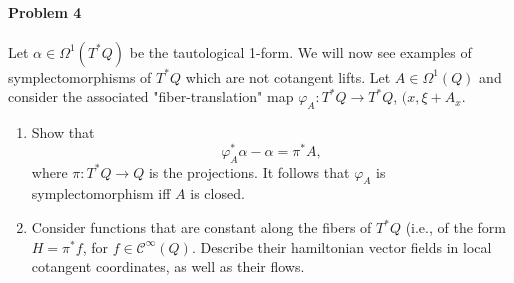 \paragraph{Problem 4} Let $\alpha\in\Omega^{1}(T^*Q)$ be the tautological 1-form. We will now see examples of symplectomorphisms of $T^*Q$ which are not cotangent lifts. Let $A\in\Omega^{1}(Q)$ and consider the associated "fiber-translation" map $\varphi_A:T^*Q\to T^*Q$, $(x,\xi+A_x$.
\begin{enumerate}[label=\alph*.]
	\item Show that
		\[\varphi^*_A\alpha-\alpha=\pi^*A,\]
		where $\pi:T^*Q\to Q$ is the projections. It follows that $\varphi_A$ is symplectomorphism iff $A$ is closed.

	\item Consider functions that are constant along the fibers of $T^*Q$ (i.e., of the form $H=\pi^*f$, for $f\in\mathcal{C}^\infty(Q)$. Describe their hamiltonian vector fields in local cotangent coordinates, as well as their flows.
\end{enumerate}

